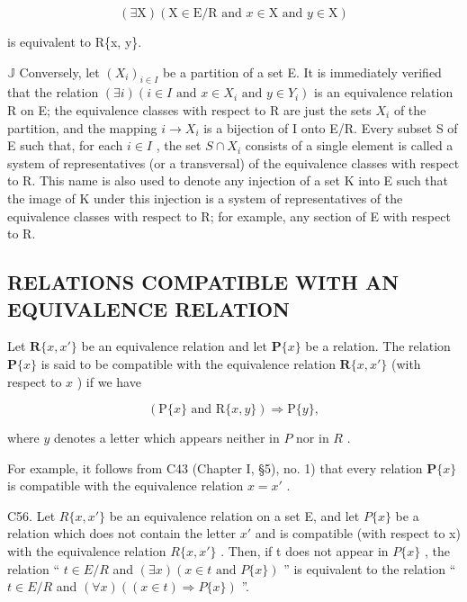 \[
(\exists \mathrm{X}) (\mathrm{X} \in \mathrm{E} / \mathrm{R} \text { and } x \in \mathrm{X} \text { and } y \in \mathrm{X})
\]

is equivalent to R\{x, y\}.

\(\mathbb{J}\) Conversely, let \((X_{i})_{i\in I}\) be a partition of a set E. It is immediately verified that the relation \((\exists i)(i\in I \text{ and } x\in X_{i} \text{ and } y\in Y_{i})\) is an equivalence relation R on E; the equivalence classes with respect to R are just the sets \(X_{i}\) of the partition, and the mapping \(i\to X_{i}\) is a bijection of I onto E/R. Every subset S of E such that, for each \(i\in I\) , the set \(S\cap X_{i}\) consists of a single element is called a system of representatives (or a transversal) of the equivalence classes with respect to R. This name is also used to denote any injection of a set K into E such that the image of K under this injection is a system of representatives of the equivalence classes with respect to R; for example, any section of E with respect to R.

\subsection{RELATIONS COMPATIBLE WITH AN EQUIVALENCE RELATION}

Let \(\mathbf{R}\{x, x'\}\) be an equivalence relation and let \(\mathbf{P}\{x\}\) be a relation. The relation \(\mathbf{P}\{x\}\) is said to be compatible with the equivalence relation \(\mathbf{R}\{x, x'\}\) (with respect to \(x\) ) if we have

\[
(\mathrm{P} \{x \} \text {   and   } \mathrm{R} \{x, y \}) \Longrightarrow \mathrm{P} \{y \},
\]

where \(y\) denotes a letter which appears neither in \(P\) nor in \(R\) .

For example, it follows from C43 (Chapter I, §5), no. 1) that every relation \(\mathbf{P}\{x\}\) is compatible with the equivalence relation \(x = x'\) .

C56. Let \(R\{x, x'\}\) be an equivalence relation on a set E, and let \(P\{x\}\) be a relation which does not contain the letter \(x'\) and is compatible (with respect to x) with the equivalence relation \(R\{x, x'\}\) . Then, if t does not appear in \(P\{x\}\) , the relation `` \(t \in E/R\) and \((\exists x)(x \in t \text{ and } P\{x\})\) '' is equivalent to the relation `` \(t \in E/R\) and \((\forall x)((x \in t) \Longrightarrow P\{x\})\) ''.

